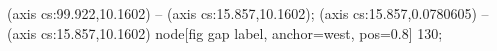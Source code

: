  (axis cs:99.922,10.1602) -- (axis cs:15.857,10.1602);
 (axis cs:15.857,0.0780605) -- (axis cs:15.857,10.1602)
  node[fig gap label, anchor=west, pos=0.8] {\texttimes{}130};
